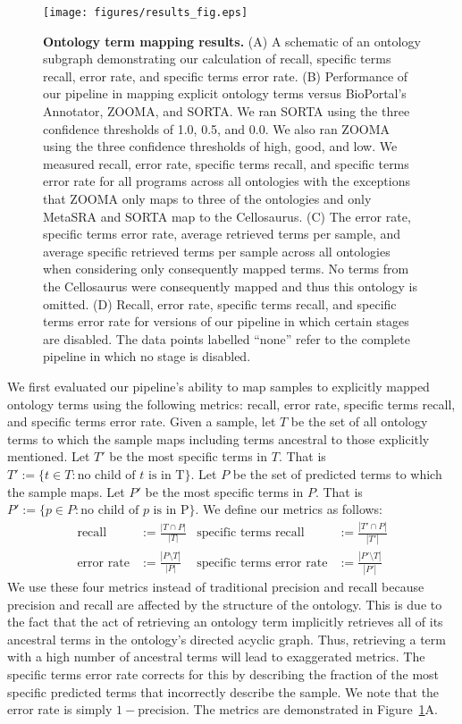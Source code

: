 \begin{figure}[!tpb]
\centerline{\texttt{[image: figures/results\_fig.eps]}}
\caption{\textbf{Ontology term mapping results.} (A) A schematic of an ontology subgraph demonstrating our calculation of recall, specific terms recall, error rate, and specific terms error rate.  (B) Performance of our pipeline in mapping explicit ontology terms versus BioPortal's Annotator, ZOOMA, and SORTA.  We ran SORTA using the three confidence thresholds of 1.0, 0.5, and 0.0. We also ran ZOOMA using the three confidence thresholds of high, good, and low.  We measured recall, error rate, specific terms recall, and specific terms error rate for all programs across all ontologies with the exceptions that ZOOMA only maps to three of the ontologies and only MetaSRA and SORTA map to the Cellosaurus. (C) The error rate, specific terms error rate, average retrieved terms per sample, and average specific retrieved terms per sample across all ontologies when considering only consequently mapped terms.  No terms from the Cellosaurus were consequently mapped and thus this ontology is omitted.  (D) Recall, error rate, specific terms recall, and specific terms error rate for versions of our pipeline in which certain stages are disabled.  The data points labelled ``none'' refer to the complete pipeline in which no stage is disabled.}\label{fig:results}
\end{figure}

We first evaluated our pipeline's ability to map samples to explicitly mapped ontology terms using the following metrics: recall, error rate, specific terms recall, and specific terms error rate.  Given a sample, let $T$ be the set of all ontology terms to which the sample maps including terms ancestral to those explicitly mentioned.  Let $T'$ be the most specific terms in $T$.  That is $T' := \{t \in T : \text{no child of $t$ is in T}\}$.  Let $P$ be the set of predicted terms to which the sample maps.  Let $P'$ be the most specific terms in $P$. That is $P' := \{p \in P : \text{no child of $p$ is in P}\}$.  We define our metrics as follows: 
\begin{align*}
\text{recall} &:= \frac{|T \cap P|}{|T|}&
\text{specific terms recall} &:= \frac{|T' \cap P|}{|T'|}
\\
\text{error rate} &:=  \frac{|P \setminus T|}{|P|}&
\text{specific terms error rate} &:=  \frac{|P' \setminus T|}{|P'|}
\end{align*}
 We use these four metrics instead of traditional precision and recall because precision and recall are affected by the structure of the ontology.  This is due to the fact that the act of retrieving an ontology term implicitly retrieves all of its ancestral terms in the ontology's directed acyclic graph.  Thus, retrieving a term with a high number of ancestral terms will lead to exaggerated metrics.  The specific terms error rate corrects for this by describing the fraction of the most specific predicted terms that incorrectly describe the sample.  We note that the error rate is simply $1 - \text{precision}$.  The metrics are demonstrated in Figure~\ref{fig:results}A. 

